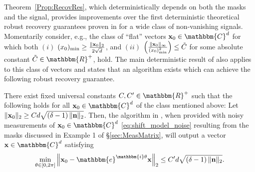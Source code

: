 Theorem~\ref{Prop:RecovRes}, which deterministically depends on both the masks and the signal, provides improvements over the first deterministic theoretical robust recovery guarantees proven in \cite{IVW2015_FastPhase} for a wide class of non-vanishing signals.  Momentarily consider, e.g., the class of ``flat'' vectors $\x_0 \in \mathbbm{C}^d$ for which both $(i)$ $(x_0)_{\rm min} \geq \frac{\| \mathbf x_0 \|_2}{2 \sqrt{d}}$, and $(ii)$ $\left( \frac{\Vert \mathbf x_0 \Vert_{\infty}}{(x_0)^2_{\rm min}} \right) \leq \tilde{C}$ for some absolute constant $\tilde{C} \in \mathbbm{R}^+$, hold.  The main deterministic result of \cite{IVW2015_FastPhase} also applies to this class of vectors and states that an algorithm exists which can achieve the following robust recovery guarantee.

\begin{theorem}
There exist fixed universal constants $C,C' \in \mathbbm{R}^+$ such that the following holds for all $\x_0 \in \mathbbm{C}^d$ of the class mentioned above:  Let 
$\| \mathbf x_0 \|_2 \geq C d  \sqrt{\left(\delta - 1 \right)\| \mathbf n \|_2}$.  Then, the  algorithm in \cite{IVW2015_FastPhase}, when provided with noisy measurements of $\x_0 \in \mathbbm{C}^d$ \eqref{eq:shift_model_noise} resulting from the masks discussed in Example 1 of \S\ref{sec:MeasMatrix}, will output a vector  $\x \in \mathbbm{C}^d$ satisfying
\[ \min_{\theta \in [0, 2 \pi]} \left\Vert  \x_0 - \mathbbm{e}^{\mathbbm{i} \theta} \x \right\Vert_2 \leq C' d  \sqrt{\left(\delta - 1 \right)\| \n \|_2 }.\]
\label{Thm:OLDRecovRes}
\end{theorem}

